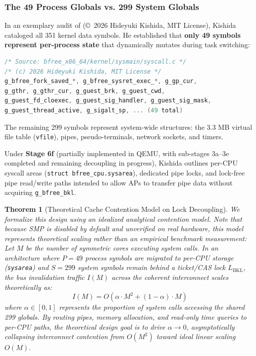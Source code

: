 \documentclass[10pt,journal,compsoc,twocolumn]{article}
\newtheorem{theorem}{Theorem}
\begin{document}
\subsubsection{The 49 Process Globals vs. 299 System Globals}
In an exemplary audit of  (\copyright~2026 Hideyuki Kishida, MIT License), Kishida cataloged all 351 kernel data symbols. He established that \textbf{only 49 symbols represent per-process state} that dynamically mutates during task switching:
\begin{lstlisting}[language=C,caption={The 49 per-process globals in \texttt{bfree\_x86\_64/kernel/sysmain/syscall.c}. Quoted excerpts of Tamazusa OS code are \copyright~2026 Hideyuki Kishida, licensed under the MIT License; third-party components keep their own licenses.}]
/* Source: bfree_x86_64/kernel/sysmain/syscall.c */
/* (c) 2026 Hideyuki Kishida, MIT License */
g_bfree_fork_saved_*, g_bfree_sysret_exec_*, g_gp_cur,
g_gthr, g_gthr_cur, g_guest_brk, g_guest_cwd,
g_guest_fd_cloexec, g_guest_sig_handler, g_guest_sig_mask,
g_guest_thread_active, g_sigalt_sp, ... (49 total)
\end{lstlisting}
The remaining 299 symbols represent system-wide structures: the 3.3 MB virtual file table (\texttt{vfile}), pipes, pseudo-terminals, network sockets, and timers.

Under \textbf{Stage 6f} (partially implemented in QEMU, with sub-stages 3a--3e completed and remaining decoupling in progress), Kishida outlines per-CPU syscall areas (\texttt{struct bfree\_cpu.sysarea}), dedicated pipe locks, and lock-free pipe read/write paths intended to allow APs to transfer pipe data without acquiring \texttt{g\_bfree\_bkl}.

\begin{theorem}[Theoretical Cache Contention Model on Lock Decoupling]
We formalize this design using an idealized analytical contention model. Note that because SMP is disabled by default and unverified on real hardware, this model represents theoretical scaling rather than an empirical benchmark measurement:
Let $M$ be the number of symmetric cores executing system calls. In an architecture where $P = 49$ process symbols are migrated to per-CPU storage (\texttt{sysarea}) and $S = 299$ system symbols remain behind a ticket/CAS lock $L_{\text{BKL}}$, the bus invalidation traffic $I(M)$ across the coherent interconnect scales theoretically as:
\begin{equation}
I(M) = O\left( \alpha \cdot M^2 + (1 - \alpha) \cdot M \right)
\end{equation}
where $\alpha \in [0, 1]$ represents the proportion of system calls accessing the shared 299 globals. By routing pipes, memory allocation, and read-only time queries to per-CPU paths, the theoretical design goal is to drive $\alpha \to 0$, asymptotically collapsing interconnect contention from $O(M^2)$ toward ideal linear scaling $O(M)$.
\end{theorem}
\end{document}
